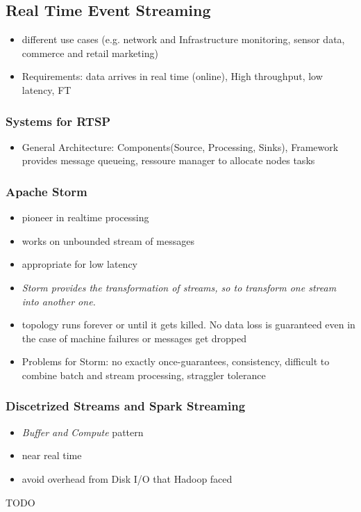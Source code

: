 \documentclass[a4paper]{article}
\begin{document}
\begin{multicols}{3}
\subsection{Real Time Event Streaming}
\begin{itemize}
    \item different use cases (e.g. network and Infrastructure monitoring, sensor data, commerce and retail marketing)
    \item Requirements: data arrives in real time (online), High throughput, low latency, FT
\end{itemize}

\subsubsection{Systems for RTSP}
\begin{itemize}
    \item General Architecture: Components(Source, Processing, Sinks), Framework provides message queueing, ressoure manager to allocate nodes tasks
\end{itemize}

\subsubsection{Apache Storm}
\begin{itemize}
    \item pioneer in realtime processing
    \item works on unbounded stream of messages 
    \item appropriate for low latency
    \item \textit{Storm provides the transformation of streams, so to transform one stream into another one.}
    \item topology runs forever or until it gets killed. No data loss is guaranteed even in the case of machine failures or messages get dropped
    \item Problems for Storm: no exactly once-guarantees, consistency, difficult to combine batch and stream processing, straggler tolerance
\end{itemize}

\subsubsection{Discetrized Streams and Spark Streaming}
\begin{itemize}
    \item \textit{Buffer and Compute} pattern
    \item near real time
    \item avoid overhead from Disk I/O that Hadoop faced 
\end{itemize}
TODO


\end{multicols}
\end{document}
